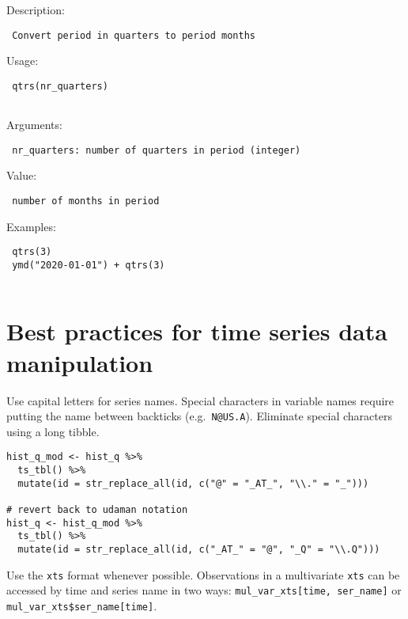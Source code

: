 \documentclass[
  letterpaper,
  DIV=11,
  numbers=noendperiod]{scrreport}
\begin{document}
Description:

\begin{verbatim}
 Convert period in quarters to period months
\end{verbatim}

Usage:

\begin{verbatim}
 qtrs(nr_quarters)
 
\end{verbatim}

Arguments:

\begin{verbatim}
 nr_quarters: number of quarters in period (integer)
\end{verbatim}

Value:

\begin{verbatim}
 number of months in period
\end{verbatim}

Examples:

\begin{verbatim}
 qtrs(3)
 ymd("2020-01-01") + qtrs(3)
 
\end{verbatim}


\chapter{Best practices for time series data
manipulation}\label{best-practices-for-time-series-data-manipulation}

Use capital letters for series names. Special characters in variable
names require putting the name between backticks (e.g.~\texttt{N@US.A}).
Eliminate special characters using a long tibble.

\begin{verbatim}
hist_q_mod <- hist_q %>%
  ts_tbl() %>%
  mutate(id = str_replace_all(id, c("@" = "_AT_", "\\." = "_")))
  
# revert back to udaman notation
hist_q <- hist_q_mod %>%
  ts_tbl() %>%
  mutate(id = str_replace_all(id, c("_AT_" = "@", "_Q" = "\\.Q")))
\end{verbatim}

Use the \texttt{xts} format whenever possible. Observations in a
multivariate \texttt{xts} can be accessed by time and series name in two
ways: \texttt{mul\_var\_xts{[}time,\ ser\_name{]}} or
\texttt{mul\_var\_xts\$ser\_name{[}time{]}}.
\end{document}
